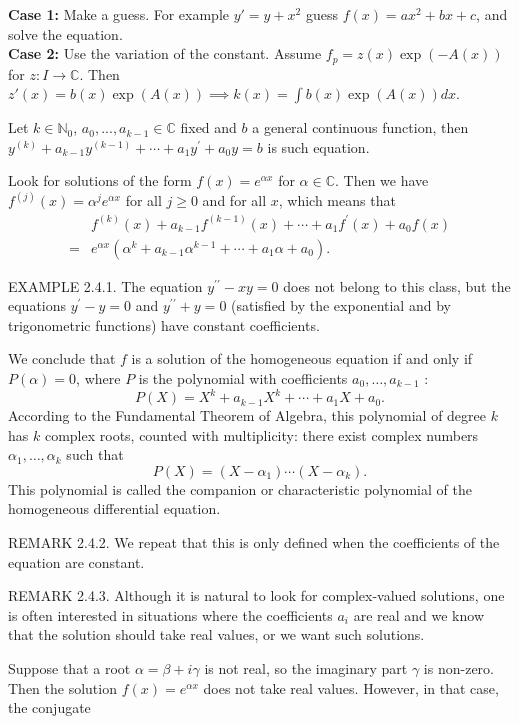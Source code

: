 \documentclass[10pt,landscape, a4paper]{article}
\newcommand{\custombox}[3]{\begin{tcolorbox}[title = \textbf{#1}, colback=#2!10!white, colframe = #2!70!white, coltitle=white]
    #3
    \end{tcolorbox}}
\newcommand{\definition}[2]{\custombox{Definition #1}{orange}{#2}}
\newcommand{\other}[2]{\custombox{#1}{green!60!black}{#2}}
\begin{document}
\begin{multicols*}{3}
    \other{Solving inhomogeneous equations}{\textbf{Case 1:} Make a guess. For example $y'=y+x^2$ guess $f(x) = ax^2+bx+c$, and solve the equation.\\
    \textbf{Case 2:} Use the variation of the constant. Assume $f_p=z(x)\exp(-A(x))$ for $z: I\to \mathbb{C}$. Then $z'(x) = b(x)\exp(A(x)) \implies k(x) = \int b(x)\exp(A(x))dx$.}
    \definition{Linear differential equations with constant coefficients}{Let $k \in \mathbb{N}_0$, $a_0,...,a_{k-1} \in \mathbb{C}$ fixed and $b$ a general continuous function, then $y^{(k)}+a_{k-1} y^{(k-1)}+\cdots+a_{1} y^{\prime}+a_{0} y=b$ is such equation.}
    \other{Solution of hom. diff. eq. with constant coefficients}{Look for solutions of the form $f(x)=e^{\alpha x}$ for $\alpha \in \mathbb{C}$. Then we have $f^{(j)}(x)=\alpha^{j} e^{\alpha x}$ for all $j \geqslant 0$ and for all $x$, which means that
    \begin{align*}
        &f^{(k)}(x)+a_{k-1} f^{(k-1)}(x)+\cdots+a_{1} f^{\prime}(x)+a_{0} f(x)\\
        = &e^{\alpha x}\left(\alpha^{k}+a_{k-1} \alpha^{k-1}+\cdots+a_{1} \alpha+a_{0}\right) .
    \end{align*} }


EXAMPLE 2.4.1. The equation $y^{\prime \prime}-x y=0$ does not belong to this class, but the equations $y^{\prime}-y=0$ and $y^{\prime \prime}+y=0$ (satisfied by the exponential and by trigonometric functions) have constant coefficients.


We conclude that $f$ is a solution of the homogeneous equation if and only if $P(\alpha)=0$, where $P$ is the polynomial with coefficients $a_{0}, \ldots, a_{k-1}$ :
$$
P(X)=X^{k}+a_{k-1} X^{k}+\cdots+a_{1} X+a_{0} .
$$
According to the Fundamental Theorem of Algebra, this polynomial of degree $k$ has $k$ complex roots, counted with multiplicity: there exist complex numbers $\alpha_{1}, \ldots, \alpha_{k}$ such that
$$
P(X)=\left(X-\alpha_{1}\right) \cdots\left(X-\alpha_{k}\right) .
$$
This polynomial is called the companion or characteristic polynomial of the homogeneous differential equation.

REMARK 2.4.2. We repeat that this is only defined when the coefficients of the equation are constant.

REMARK 2.4.3. Although it is natural to look for complex-valued solutions, one is often interested in situations where the coefficients $a_{i}$ are real and we know that the solution should take real values, or we want such solutions.

Suppose that a root $\alpha=\beta+i \gamma$ is not real, so the imaginary part $\gamma$ is non-zero. Then the solution $f(x)=e^{\alpha x}$ does not take real values. However, in that case, the conjugate


\end{multicols*}
\end{document}
